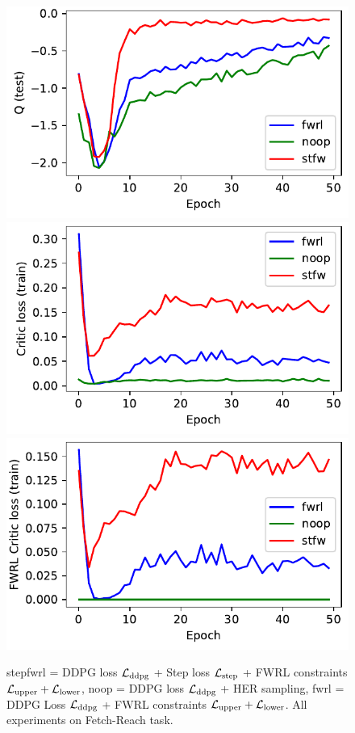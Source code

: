 \begin{figure}
  \includegraphics[width=\frac\columnwidth]{media/res/f0d4cfa-FetchReach-v1-stfw-none/test/mean_Q.pdf}%
  \includegraphics[width=\frac\columnwidth]{media/res/f0d4cfa-FetchReach-v1-stfw-none/train/critic_loss.pdf}%
  \includegraphics[width=\frac\columnwidth]{media/res/f0d4cfa-FetchReach-v1-stfw-none/train/critic_addnl_loss.pdf}\\
  \caption{
    stepfwrl = DDPG loss $\mathcal{L}_{\text{ddpg}}$ + Step loss $\mathcal{L}_{\text{step}}$
    + FWRL constraints $\mathcal{L}_{\text{upper}} + \mathcal{L}_{\text{lower}}$, noop =
    DDPG loss $\mathcal{L}_{\text{ddpg}}$  + HER
    sampling, fwrl = DDPG Loss $\mathcal{L}_{\text{ddpg}}$ + FWRL constraints $\mathcal{L}_{\text{upper}} + \mathcal{L}_{\text{lower}}$.
    All experiments on Fetch-Reach task.
  }%
  \label{fig:fwrl-stepfwrl-noop-FetchReach}%
\end{figure}%
% 

